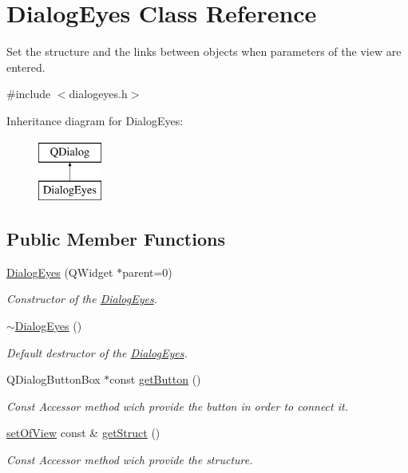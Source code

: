 \hypertarget{class_dialog_eyes}{}\section{Dialog\+Eyes Class Reference}
\label{class_dialog_eyes}


Set the structure and the links between objects when parameters of the view are entered.  




{\ttfamily \#include $<$dialogeyes.\+h$>$}

Inheritance diagram for Dialog\+Eyes\+:\begin{figure}[H]
\begin{center}
\leavevmode
\includegraphics[height=2.000000cm]{class_dialog_eyes}
\end{center}
\end{figure}
\subsection*{Public Member Functions}
\begin{DoxyCompactItemize}
\item 
\hyperlink{class_dialog_eyes_a97beed52342196a6063d41f03dd63953}{Dialog\+Eyes} (Q\+Widget $\ast$parent=0)
\begin{DoxyCompactList}\small\item\em Constructor of the \hyperlink{class_dialog_eyes}{Dialog\+Eyes}. \end{DoxyCompactList}\item 
\hyperlink{class_dialog_eyes_a751e612833e5556f5c53dfc4875ef252}{$\sim$\+Dialog\+Eyes} ()
\begin{DoxyCompactList}\small\item\em Default destructor of the \hyperlink{class_dialog_eyes}{Dialog\+Eyes}. \end{DoxyCompactList}\item 
Q\+Dialog\+Button\+Box $\ast$const \hyperlink{class_dialog_eyes_a29267293c5a4b873aa59c7baafd65227}{get\+Button} ()
\begin{DoxyCompactList}\small\item\em Const Accessor method wich provide the button in order to connect it. \end{DoxyCompactList}\item 
\hyperlink{structset_of_view}{set\+Of\+View} const  \& \hyperlink{class_dialog_eyes_a71df236a91eafd03c9747ec3d245d017}{get\+Struct} ()
\begin{DoxyCompactList}\small\item\em Const Accessor method wich provide the structure. \end{DoxyCompactList}\end{DoxyCompactItemize}


